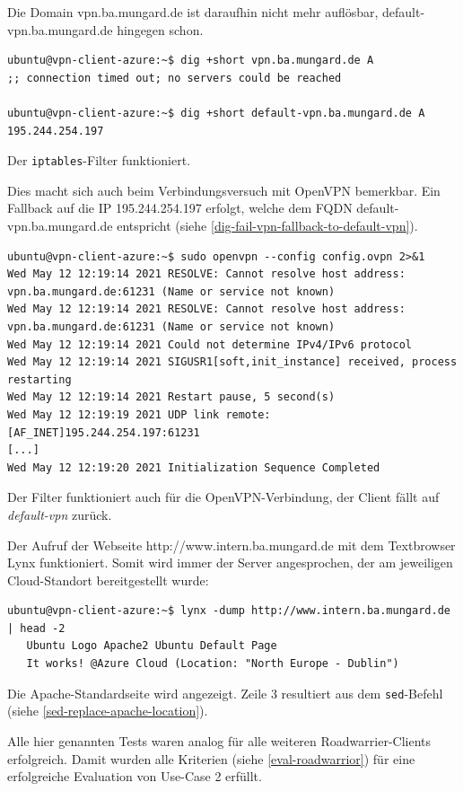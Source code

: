 Die Domain vpn.ba.mungard.de ist daraufhin nicht mehr auflösbar, default-vpn.ba.mungard.de hingegen schon.
\begin{listing}[h]
\begin{verbatim}
ubuntu@vpn-client-azure:~$ dig +short vpn.ba.mungard.de A
;; connection timed out; no servers could be reached

ubuntu@vpn-client-azure:~$ dig +short default-vpn.ba.mungard.de A
195.244.254.197

\end{verbatim}
\caption{Der \texttt{iptables}-Filter funktioniert.}
\label{dig-fail-vpn-fallback-to-default-vpn}
\end{listing}\FloatBarrier
Dies macht sich auch beim Verbindungsversuch mit OpenVPN bemerkbar. Ein Fallback auf die IP 195.244.254.197 erfolgt, welche dem FQDN default-vpn.ba.mungard.de entspricht (siehe \ref{dig-fail-vpn-fallback-to-default-vpn}).
\begin{listing}[h]
\begin{verbatim}
ubuntu@vpn-client-azure:~$ sudo openvpn --config config.ovpn 2>&1
Wed May 12 12:19:14 2021 RESOLVE: Cannot resolve host address: vpn.ba.mungard.de:61231 (Name or service not known)
Wed May 12 12:19:14 2021 RESOLVE: Cannot resolve host address: vpn.ba.mungard.de:61231 (Name or service not known)
Wed May 12 12:19:14 2021 Could not determine IPv4/IPv6 protocol
Wed May 12 12:19:14 2021 SIGUSR1[soft,init_instance] received, process restarting
Wed May 12 12:19:14 2021 Restart pause, 5 second(s)
Wed May 12 12:19:19 2021 UDP link remote: [AF_INET]195.244.254.197:61231
[...]
Wed May 12 12:19:20 2021 Initialization Sequence Completed

\end{verbatim}
\caption{Der Filter funktioniert auch für die OpenVPN-Verbindung, der Client fällt auf \textit{default-vpn} zurück.}
\label{connection-fail-vpn-fallback-default-vpn}
\end{listing}\FloatBarrier

Der Aufruf der Webseite \glqq http://www.intern.ba.mungard.de\grqq{} mit dem Textbrowser Lynx funktioniert. Somit wird immer der Server angesprochen, der am jeweiligen Cloud-Standort bereitgestellt wurde:
\begin{listing}[h]
\begin{verbatim}
ubuntu@vpn-client-azure:~$ lynx -dump http://www.intern.ba.mungard.de | head -2
   Ubuntu Logo Apache2 Ubuntu Default Page
   It works! @Azure Cloud (Location: "North Europe - Dublin")

\end{verbatim}
\caption{Die Apache-Standardseite wird angezeigt. Zeile 3 resultiert aus dem \texttt{sed}-Befehl (siehe \ref{sed-replace-apache-location}).}
\label{lynx-default-page}
\end{listing}\FloatBarrier
Alle hier genannten Tests waren analog für alle weiteren Roadwarrier-Clients erfolgreich. Damit wurden alle Kriterien (siehe \ref{eval-roadwarrior}) für eine erfolgreiche Evaluation von Use-Case 2 erfüllt.



